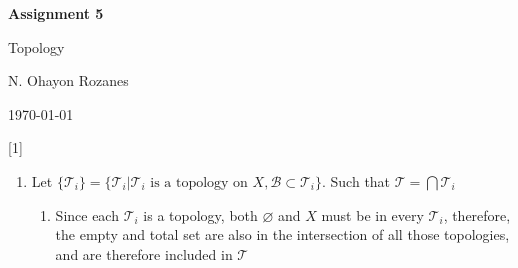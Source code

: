 \documentclass{article} %
\newcommand{\question}[2][]{
  \begin{flushleft}
    \textbf{Question #1}: \textit{#2}

\end{flushleft}}
\newcommand{\maketitletwo}[2][]{
  \begin{center}
    \Large{\textbf{Assignment #1}

    Topology} %
    \vspace{5pt}

    \normalsize{N. Ohayon Rozanes  %

    \today}        %
    \vspace{15pt}

\end{center}}
\begin{document}
\maketitletwo[5]  %

\question[1]{}
\begin{enumerate}[label=\alph*)]
\item Let $\{\mathcal{T}_i\} = \{ \mathcal{T}_i | \mathcal{T}_i \text{ is a
  topology on } X, \mathcal{B} \subset \mathcal{T}_i\}$. Such that
  $\mathcal{T} = \bigcap \mathcal{T}_i$

  \begin{enumerate}
    \item Since each $\mathcal{T}_i$ is a topology, both
      $\varnothing$ and $X$ must be in every $\mathcal{T}_i$,
      therefore, the empty and total set are also in the intersection
      of all those topologies, and are therefore included in $\mathcal{T}$


\end{enumerate}
\end{enumerate}
\end{document}
